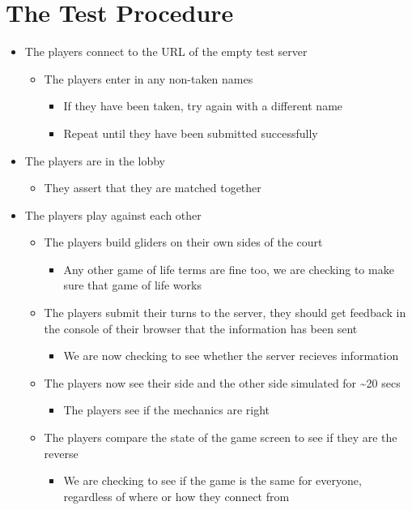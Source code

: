 \documentclass[11pt]{article}
\begin{document}
\section{The Test Procedure}
\label{sec:org070a095}
\begin{itemize}
\item The players connect to the URL of the empty test server
\begin{itemize}
\item The players enter in any non-taken names
\begin{itemize}
\item If they have been taken, try again with a different name
\item Repeat until they have been submitted successfully
\end{itemize}
\end{itemize}
\item The players are in the lobby
\begin{itemize}
\item They assert that they are matched together
\end{itemize}
\item The players play against each other
\begin{itemize}
\item The players build gliders on their own sides of the court
\begin{itemize}
\item Any other game of life terms are fine too, we are checking to make sure that game of life works
\end{itemize}
\item The players submit their turns to the server, they should get feedback in the console of their browser that
the information has been sent
\begin{itemize}
\item We are now checking to see whether the server recieves information
\end{itemize}
\item The players now see their side and the other side simulated for \textasciitilde{}20 secs
\begin{itemize}
\item The players see if the mechanics are right
\end{itemize}
\item The players compare the state of the game screen to see if they are the reverse
\begin{itemize}
\item We are checking to see if the game is the same for everyone, regardless of where or how they connect from

\end{itemize}
\end{itemize}
\end{itemize}
\end{document}
